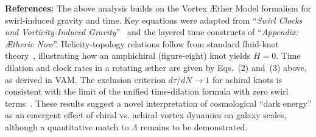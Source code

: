 \documentclass[11pt]{article}
\begin{document}
    \textbf{References:} The above analysis builds on the Vortex Æther Model formalism for swirl-induced gravity and time. Key equations were adapted from “\textit{Swirl Clocks and Vorticity-Induced Gravity}”~\cite{iskandarani2025vam2} and the layered time constructs of “\textit{Appendix: Ætheric Now}”. Helicity-topology relations follow from standard fluid-knot theory~\cite{knot_theroy_in_fluid}, illustrating how an amphichiral (figure-eight) knot yields $H=0$. Time dilation and clock rates in a rotating æther are given by Eqs.~(2) and~(3) above, as derived in VAM. The exclusion criterion $d\tau/dN\to1$ for achiral knots is consistent with the limit of the unified time-dilation formula with zero swirl terms~\cite{iskandarani2025vam2}. These results suggest a novel interpretation of cosmological “dark energy” as an emergent effect of chiral vs. achiral vortex dynamics on galaxy scales, although a quantitative match to $\Lambda$ remains to be demonstrated.

    
    

    \appendix
    \def\standalonechapter{false}
    
\end{document}
